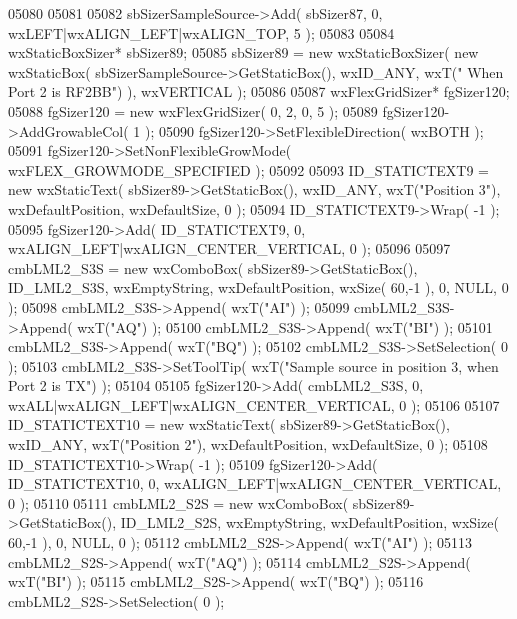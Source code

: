 \begin{DoxyCode}
05080     
05081     
05082     sbSizerSampleSource->Add( sbSizer87, 0, wxLEFT|wxALIGN\_LEFT|wxALIGN\_TOP, 5 );
05083     
05084     wxStaticBoxSizer* sbSizer89;
05085     sbSizer89 = \textcolor{keyword}{new} wxStaticBoxSizer( \textcolor{keyword}{new} wxStaticBox( sbSizerSampleSource->GetStaticBox(), wxID\_ANY, wxT(\textcolor{stringliteral}{"
      When Port 2 is RF2BB"}) ), wxVERTICAL );
05086     
05087     wxFlexGridSizer* fgSizer120;
05088     fgSizer120 = \textcolor{keyword}{new} wxFlexGridSizer( 0, 2, 0, 5 );
05089     fgSizer120->AddGrowableCol( 1 );
05090     fgSizer120->SetFlexibleDirection( wxBOTH );
05091     fgSizer120->SetNonFlexibleGrowMode( wxFLEX\_GROWMODE\_SPECIFIED );
05092     
05093     ID_STATICTEXT9 = \textcolor{keyword}{new} wxStaticText( sbSizer89->GetStaticBox(), wxID\_ANY, wxT(\textcolor{stringliteral}{"Position 3"}), 
      wxDefaultPosition, wxDefaultSize, 0 );
05094     ID_STATICTEXT9->Wrap( -1 );
05095     fgSizer120->Add( ID_STATICTEXT9, 0, wxALIGN\_LEFT|wxALIGN\_CENTER\_VERTICAL, 0 );
05096     
05097     cmbLML2_S3S = \textcolor{keyword}{new} wxComboBox( sbSizer89->GetStaticBox(), ID_LML2_S3S, wxEmptyString, wxDefaultPosition,
       wxSize( 60,-1 ), 0, NULL, 0 );
05098     cmbLML2_S3S->Append( wxT(\textcolor{stringliteral}{"AI"}) );
05099     cmbLML2_S3S->Append( wxT(\textcolor{stringliteral}{"AQ"}) );
05100     cmbLML2_S3S->Append( wxT(\textcolor{stringliteral}{"BI"}) );
05101     cmbLML2_S3S->Append( wxT(\textcolor{stringliteral}{"BQ"}) );
05102     cmbLML2_S3S->SetSelection( 0 );
05103     cmbLML2_S3S->SetToolTip( wxT(\textcolor{stringliteral}{"Sample source in position 3, when Port 2 is TX"}) );
05104     
05105     fgSizer120->Add( cmbLML2_S3S, 0, wxALL|wxALIGN\_LEFT|wxALIGN\_CENTER\_VERTICAL, 0 );
05106     
05107     ID_STATICTEXT10 = \textcolor{keyword}{new} wxStaticText( sbSizer89->GetStaticBox(), wxID\_ANY, wxT(\textcolor{stringliteral}{"Position 2"}), 
      wxDefaultPosition, wxDefaultSize, 0 );
05108     ID_STATICTEXT10->Wrap( -1 );
05109     fgSizer120->Add( ID_STATICTEXT10, 0, wxALIGN\_LEFT|wxALIGN\_CENTER\_VERTICAL, 0 );
05110     
05111     cmbLML2_S2S = \textcolor{keyword}{new} wxComboBox( sbSizer89->GetStaticBox(), ID_LML2_S2S, wxEmptyString, wxDefaultPosition,
       wxSize( 60,-1 ), 0, NULL, 0 );
05112     cmbLML2_S2S->Append( wxT(\textcolor{stringliteral}{"AI"}) );
05113     cmbLML2_S2S->Append( wxT(\textcolor{stringliteral}{"AQ"}) );
05114     cmbLML2_S2S->Append( wxT(\textcolor{stringliteral}{"BI"}) );
05115     cmbLML2_S2S->Append( wxT(\textcolor{stringliteral}{"BQ"}) );
05116     cmbLML2_S2S->SetSelection( 0 );

\end{DoxyCode}
